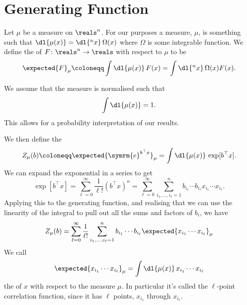 \documentclass[fleqn]{NotesClass}
\newcommand{\e}{\symrm{e}}
\newcommand{\trans}{{\top}}
\begin{document}
    \section{Generating Function}
    Let \(\mu\) be a measure on \(\reals^n\).
    For our purposes a measure, \(\mu\), is something such that \(\dl{\mu(x)} = \dl{^nx}\, \Omega(x)\) where \(\Omega\) is some integrable function.
    We define the  of \(F \colon \reals^n \to \reals\) with respect to \(\mu\) to be
    \begin{equation}
        \expected{F}_\mu \coloneqq \int \dl{\mu(x)} \, F(x) = \int \dl{^nx} \, \Omega(x) F(x).
    \end{equation}
    
    We assume that the measure is normalised such that
    \begin{equation}
        \int \dl{\mu(x)} = 1.
    \end{equation}
    This allows for a probability interpretation of our results.
    
    We then define the 
    \begin{equation}
        Z_\mu(b) \coloneqq \expected{\e^{b^\trans x}}_\mu = \int \dl{\mu(x)} \, \exp[b^\trans x].
    \end{equation}
    We can expand the exponential in a series to get
    \begin{equation}
        \exp[b^\trans x] = \sum_{\ell = 0}^{\infty} \frac{1}{\ell!} (b^\trans x)^n = \sum_{\ell = 0}^{\infty} \sum_{i_1, \dotsc, i_{\ell} = 1}^{n} b_{i_1}\dotsm b_{i_\ell} x_{i_1} \dotsm x_{i_\ell}.
    \end{equation}
    Applying this to the generating function, and realising that we can use the linearity of the integral to pull out all the sums and factors of \(b_i\), we have
    \begin{equation}
        Z_\mu(b) = \sum_{\ell = 0}^{\infty} \frac{1}{\ell!} \sum_{i_1, \dotsc, i_\ell = 1}^{n} b_{i_1} \dotsm b_{i_\ell} \expected{x_{i_1} \dotsm x_{i_\ell}}_\mu
    \end{equation}
    We call
    \begin{equation}
        \expected{x_{i_1} \dotsm x_{i_\ell}}_\mu = \int \dl{\mu(x)} \, x_{i_1} \dotsm x_{i_\ell}
    \end{equation}
    the  of \(x\) with respect to the measure \(\mu\).
    In particular it's called the \(\ell\)-point correlation function, since it has \(\ell\) points, \(x_{i_1}\) through \(x_{i_\ell}\).
    
\end{document}
